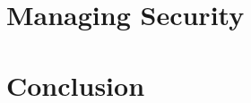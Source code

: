\documentclass{sig-alternate}
\begin{document}
\section{Managing Security}
\label{sec:mgmt}

\section{Conclusion}
\label{sec:conclusion}



\end{document}
